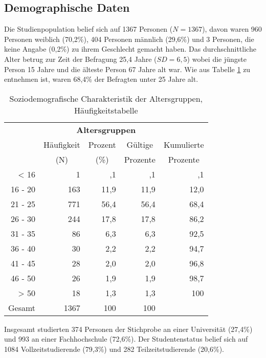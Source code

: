 \subsection{Demographische Daten}
Die Studienpopulation belief sich auf 1367 Personen ($N = 1367$), davon waren 960 Personen weiblich (70,2\%), 404 Personen männlich (29,6\%) und 3 Personen, die keine Angabe (0,2\%) zu ihrem Geschlecht gemacht haben. Das durchschnittliche Alter betrug zur Zeit der Befragung 25,4 Jahre ($SD = 6,5$) wobei die jüngste Person 15 Jahre und die älteste Person 67 Jahre alt war. Wie aus Tabelle \ref{table.sozidemoAlter} zu entnehmen ist, waren 68,4\% der Befragten unter 25 Jahre alt. \\ 
\begin{table}[ht]
    \centering 
    \caption{Soziodemografische Charakteristik der Altersgruppen, Häufigkeitstabelle}
    \begin{tabular}[t]{|r|r|r|r|r|} 
        \hline
        \multicolumn{5}{|c|}{\textbf{Altersgruppen}}\\        
        \multicolumn{1}{|c}{} & \multicolumn{1}{c|}{Häufigkeit} & \multicolumn{1}{|c|}{Prozent} & \multicolumn{1}{|c|}{Gültige} & \multicolumn{1}{|c|}{Kumulierte}\\
        \multicolumn{1}{|c}{} & \multicolumn{1}{c|}{(N)} & \multicolumn{1}{|c|}{(\%)} & \multicolumn{1}{|c|}{Prozente} & \multicolumn{1}{|c|}{Prozente} \\
        \hline
        < 16 & 1 & ,1 & ,1 & ,1\\
        16 - 20 & 163 & 11,9 & 11,9 & 12,0\\
        21 - 25 & 771 & 56,4 & 56,4 & 68,4\\
        26 - 30 & 244 & 17,8 & 17,8 & 86,2\\
        31 - 35 & 86 & 6,3 & 6,3 & 92,5\\
        36 - 40 & 30 & 2,2 & 2,2 & 94,7\\
        41 - 45 & 28 & 2,0 & 2,0 & 96,8\\  
        46 - 50 & 26 & 1,9 & 1,9 & 98,7\\
        > 50  & 18 & 1,3 & 1,3 & 100\\
        Gesamt  & 1367 & 100 & 100 & \\
        \hline
    \end{tabular}
    \label{table.sozidemoAlter}
\end{table}
Insgesamt studierten 374 Personen der Stichprobe an einer Universität (27,4\%) und 993 an einer Fachhochschule (72,6\%). Der Studentenstatus belief sich auf 1084 Vollzeitstudierende (79,3\%) und 282 Teilzeitstudierende (20,6\%). \\
